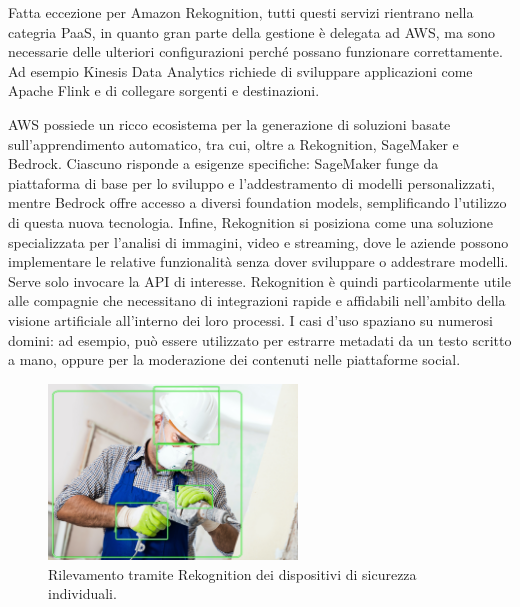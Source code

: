 Fatta eccezione per Amazon Rekognition, tutti questi servizi rientrano nella categria PaaS, in quanto gran parte della gestione è delegata ad AWS, ma sono necessarie delle ulteriori configurazioni perché possano funzionare correttamente. Ad esempio Kinesis Data Analytics richiede di sviluppare applicazioni come Apache Flink e di collegare sorgenti e destinazioni. %

AWS possiede un ricco ecosistema per la generazione di soluzioni basate sull'apprendimento automatico, tra cui, oltre a Rekognition, SageMaker e Bedrock. Ciascuno risponde a esigenze specifiche: SageMaker funge da piattaforma di base per lo sviluppo e l'addestramento di modelli personalizzati, mentre Bedrock offre accesso a diversi foundation models, semplificando l'utilizzo di questa nuova tecnologia. Infine, Rekognition si posiziona come una soluzione specializzata per l’analisi di immagini, video e streaming, dove le aziende possono implementare le relative funzionalità senza dover sviluppare o addestrare modelli. Serve solo invocare la API di interesse. Rekognition è quindi particolarmente utile alle compagnie che necessitano di integrazioni rapide e affidabili nell'ambito della visione artificiale all'interno dei loro processi. I casi d'uso spaziano su numerosi domini: ad esempio, può essere utilizzato per estrarre metadati da un testo scritto a mano, oppure per la moderazione dei contenuti nelle piattaforme social.

\begin{figure}[htbp]
    \centering
    \includegraphics[width=0.59\textwidth]{figures/worker-with-bb.png}
    \caption{Rilevamento tramite Rekognition dei dispositivi di sicurezza individuali.}
    \label{fig:ppe-example}
\end{figure}


